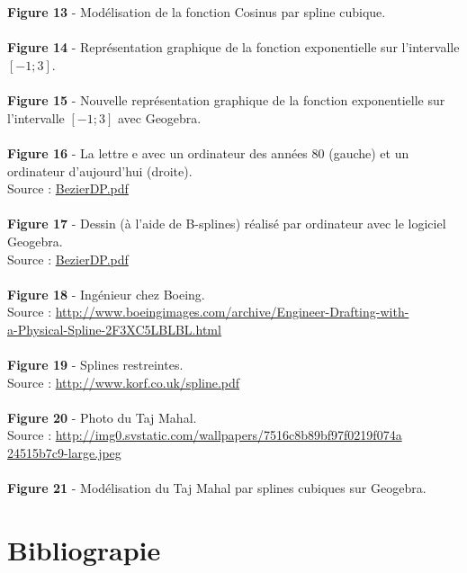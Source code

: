 \documentclass{article}
\begin{document}
\\
\\
\textbf{Figure 13} - Mod\'elisation de la fonction Cosinus par spline cubique.
\\
\\
\textbf{Figure 14} - Repr\'esentation graphique de la fonction exponentielle sur l'intervalle $[-1;3]$.
\\
\\
\textbf{Figure 15} - Nouvelle repr\'esentation graphique de la fonction exponentielle sur l'intervalle $[-1;3]$ avec Geogebra.
\\
\\
\textbf{Figure 16} - La lettre e avec un ordinateur des ann\'ees 80 (gauche) et un ordinateur d'aujourd'hui (droite).
\\Source : \url{BezierDP.pdf}
\\
\\
\textbf{Figure 17} - Dessin (\`a l'aide de B-splines) r\'ealis\'e par ordinateur avec le logiciel Geogebra. 
\\Source : \url{BezierDP.pdf}
\\
\\
\textbf{Figure 18} - Ing\'enieur chez Boeing. 
\\Source : \url{http://www.boeingimages.com/archive/Engineer-Drafting-with-}
\\\url{a-Physical-Spline-2F3XC5LBLBL.html}
\\
\\
\textbf{Figure 19} - Splines restreintes. 
\\Source : \url{ http://www.korf.co.uk/spline.pdf}
\\
\\
\textbf{Figure 20} - Photo du Taj Mahal.
\\Source : \url{http://img0.svstatic.com/wallpapers/7516c8b89bf97f0219f074a}
\\\url{24515b7c9-large.jpeg}
\\
\\
\textbf{Figure 21} - Mod\'elisation du Taj Mahal par splines cubiques sur Geogebra.

\newpage
\section{Bibliograpie}
\end{document}
